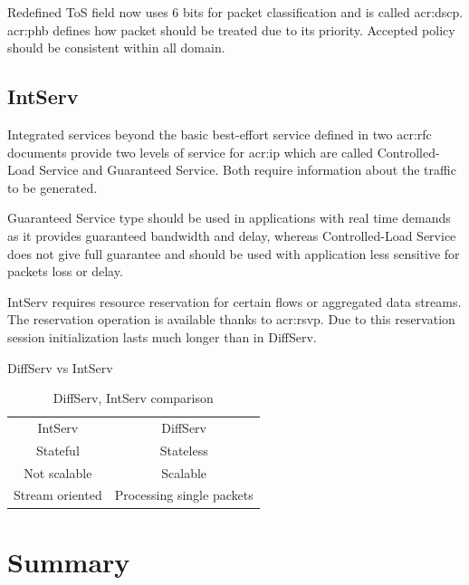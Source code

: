 \documentclass[11pt]{book}
\begin{document}
        \medskip

        Redefined ToS field now uses 6 bits for packet classification and is called \gls{acr:dscp}. \gls{acr:phb}
        defines how packet should be treated due to its priority. Accepted policy should be consistent within all
        domain.


      \subsection{IntServ}

        Integrated services beyond the basic best-effort service defined in two \gls{acr:rfc} documents provide two levels of
        service for \gls{acr:ip} which are called Controlled-Load Service and Guaranteed Service. Both require
        information about the traffic to be generated. 

        Guaranteed Service type should be used in applications with real time demands as it provides guaranteed
        bandwidth and delay, whereas Controlled-Load Service does not give full guarantee and should be used with
        application less sensitive for packets loss or delay.

        IntServ requires resource reservation for certain flows or aggregated data streams. The reservation operation is
        available thanks to \gls{acr:rsvp}. Due to this reservation session initialization lasts much longer than in
        DiffServ.

        {DiffServ vs IntServ}

        \begin{table}[ht]
          \caption{DiffServ, IntServ comparison}
          \centering %
          \begin{tabular}{c c}
            \hline \hline
            IntServ         & DiffServ \\
            Stateful        & Stateless \\
            Not scalable    & Scalable \\
            Stream oriented & Processing single packets \\
            \hline
          \end{tabular}
        \end{table}


    \section*{Summary}
\end{document}
